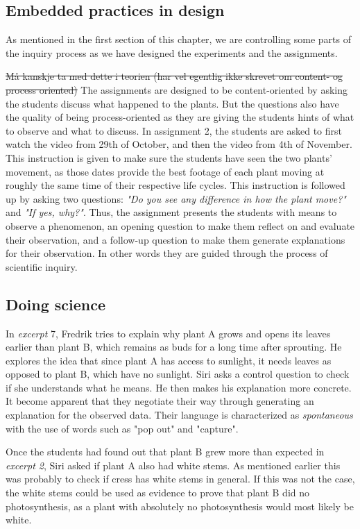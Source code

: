 \subsection{Embedded practices in design}
As mentioned in the first section of this chapter, we are controlling some parts of the inquiry process as we have designed the experiments and the assignments. 

\sout{Må kanskje ta med dette i teorien (har vel egentlig ikke skrevet om content- og process oriented)}
The assignments are designed to be content-oriented by asking the students discuss what happened to the plants. But the questions also have the quality of being process-oriented as they are giving the students hints of what to observe and what to discuss. In assignment 2, the students are asked to first watch the video from 29th of October, and then the video from 4th of November. This instruction is given to make sure the students have seen the two plants' movement, as those dates provide the best footage of each plant moving at roughly the same time of their respective life cycles. This instruction is followed up by asking two questions: \emph{"Do you see any difference in how the plant move?"} and \emph{"If yes, why?"}. Thus, the assignment presents the students with means to observe a phenomenon, an opening question to make them reflect on and evaluate their observation, and a follow-up question to make them generate explanations for their observation. In other words they are guided through the process of scientific inquiry.

\subsection{Doing science}
In \emph{excerpt} 7, Fredrik tries to explain why plant A grows and opens its leaves earlier than plant B, which remains as buds for a long time after sprouting. He explores the idea that since plant A has access to sunlight, it needs leaves as opposed to plant B, which have no sunlight. Siri asks a control question to check if she understands what he means. He then makes his explanation more concrete. It become apparent that they negotiate their way through generating an explanation for the observed data. Their language is characterized as \emph{spontaneous} with the use of words such as "pop out" and "capture". 

Once the students had found out that plant B grew more than expected in \emph{excerpt 2}, Siri asked if plant A also had white stems. As mentioned earlier this was probably to check if cress has white stems in general. If this was not the case, the white stems could be used as evidence to prove that plant B did no photosynthesis, as a plant with absolutely no photosynthesis would most likely be white. 

